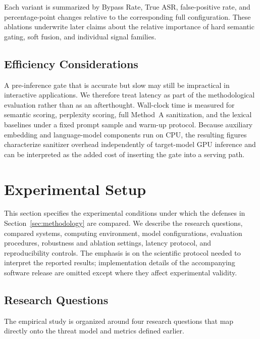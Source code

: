 \documentclass{article}
\begin{document}
Each variant is summarized by Bypass Rate, True ASR, false-positive rate, and percentage-point changes relative to the corresponding full configuration.
These ablations underwrite later claims about the relative importance of hard semantic gating, soft fusion, and individual signal families.

\subsection{Efficiency Considerations}
\label{sec:runtime}

A pre-inference gate that is accurate but slow may still be impractical in interactive applications.
We therefore treat latency as part of the methodological evaluation rather than as an afterthought.
Wall-clock time is measured for semantic scoring, perplexity scoring, full Method~A sanitization, and the lexical baselines under a fixed prompt sample and warm-up protocol.
Because auxiliary embedding and language-model components run on CPU, the resulting figures characterize sanitizer overhead independently of target-model GPU inference and can be interpreted as the added cost of inserting the gate into a serving path.



\section{Experimental Setup}
\label{sec:experimental-setup}

This section specifies the experimental conditions under which the defenses in Section~\ref{sec:methodology} are compared.
We describe the research questions, compared systems, computing environment, model configurations, evaluation procedures, robustness and ablation settings, latency protocol, and reproducibility controls.
The emphasis is on the scientific protocol needed to interpret the reported results; implementation details of the accompanying software release are omitted except where they affect experimental validity.

\subsection{Research Questions}
\label{sec:rq}

The empirical study is organized around four research questions that map directly onto the threat model and metrics defined earlier.
\end{document}
